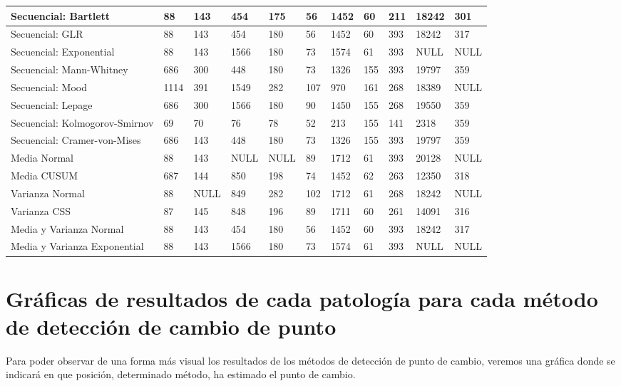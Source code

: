 \documentclass[runningheads,a4paper,12pt]{report}
\begin{document}
\begin{table}[H]
\begin{turn}{90}
\begin{tabular}{|l|l|l|l|l|l|l|l|l|l|l|}
Secuencial: Bartlett           & 88   & 143  & 454  & 175  & 56  & 1452 & 60   & 211 & 18242 & 301  \\ \hline
Secuencial: GLR                & 88   & 143  & 454  & 180  & 56  & 1452 & 60   & 393 & 18242 & 317  \\ \hline
Secuencial: Exponential        & 88   & 143  & 1566 & 180  & 73  & 1574 & 61   & 393 & NULL  & NULL \\ \hline
Secuencial: Mann-Whitney       & 686  & 300  & 448  & 180  & 73  & 1326 & 155  & 393 & 19797 & 359  \\ \hline
Secuencial: Mood               & 1114 & 391  & 1549 & 282  & 107 & 970  & 161  & 268 & 18389 & NULL \\ \hline
Secuencial: Lepage             & 686  & 300  & 1566 & 180  & 90  & 1450 & 155  & 268 & 19550 & 359  \\ \hline
Secuencial: Kolmogorov-Smirnov & 69   & 70   & 76   & 78   & 52  & 213  & 155  & 141 & 2318  & 359  \\ \hline
Secuencial: Cramer-von-Mises   & 686  & 143  & 448  & 180  & 73  & 1326 & 155  & 393 & 19797 & 359  \\ \hline
Media Normal                   & 88   & 143  & NULL & NULL & 89  & 1712 & 61   & 393 & 20128 & NULL \\ \hline
Media CUSUM                    & 687  & 144  & 850  & 198  & 74  & 1452 & 62   & 263 & 12350 & 318  \\ \hline
Varianza Normal                & 88   & NULL & 849  & 282  & 102 & 1712 & 61   & 268 & 18242 & NULL \\ \hline
Varianza CSS                   & 87   & 145  & 848  & 196  & 89  & 1711 & 60   & 261 & 14091 & 316  \\ \hline
Media y Varianza Normal        & 88   & 143  & 454  & 180  & 56  & 1452 & 60   & 393 & 18242 & 317  \\ \hline
Media y Varianza Exponential   & 88   & 143  & 1566 & 180  & 73  & 1574 & 61   & 393 & NULL  & NULL \\ \hline
\end{tabular}
\end{turn}
\end{table}

\newpage
\section{Gráficas de resultados de cada patología para cada método de detección de cambio de punto}
Para poder observar de una forma más visual los resultados de los métodos de detección de punto de cambio, veremos una gráfica donde se indicará en que posición, determinado método, ha estimado el punto de cambio.
\end{document}

